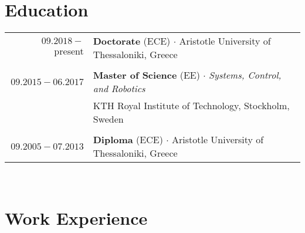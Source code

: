 \documentclass[a4paper,10pt,twoside]{article}
\begin{document}


\par{\bigskip\par}
\vspace{1cm}



\section{Education}

\begin{tabular}{rp{12cm}}
$09.2018 -$ present & \textbf{Doctorate} (ECE) $\cdot$ Aristotle University of Thessaloniki, Greece \\
&\\
$09.2015 - 06.2017$ & \textbf{Master of Science} (EE) $\cdot$ \textit{Systems, Control, and Robotics}\\
                    & KTH Royal Institute of Technology, Stockholm, Sweden\\
&\\
$09.2005 - 07.2013$ & \textbf{Diploma} (ECE) $\cdot$ Aristotle University of Thessaloniki, Greece\\
\end{tabular}\\



\section{Work Experience}
\end{document}
